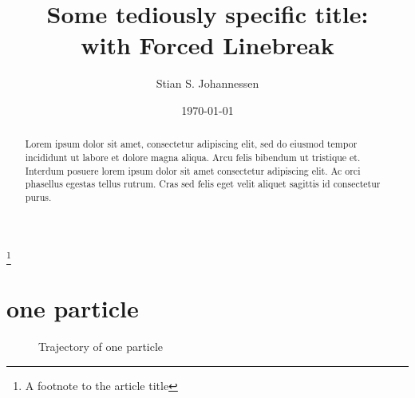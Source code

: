 \documentclass[10pt,a4paper,rmp,twocolumn,secnumarabic,numerical,balancelastpage,nofootinbib,hyperref=pdftex,superscriptaddress]{revtex4-2}
\begin{document}

\title{Some tediously specific title:\\with Forced Linebreak}%
\thanks{A footnote to the article title}%

\author{Stian S. Johannessen}
\date{\today}

\begin{abstract}
	Lorem ipsum dolor sit amet, consectetur adipiscing elit, sed do eiusmod tempor incididunt ut labore et dolore magna aliqua. Arcu felis bibendum ut tristique et. Interdum posuere lorem ipsum dolor sit amet consectetur adipiscing elit. Ac orci phasellus egestas tellus rutrum. Cras sed felis eget velit aliquet sagittis id consectetur purus.
\end{abstract}

\maketitle

	\section{one particle}
	
	\begin{figure*}[htb]
		\centering
		\scalebox{0.9}{}
		\label{bg}
		\caption{Trajectory of one particle}
	\end{figure*}
\end{document}
